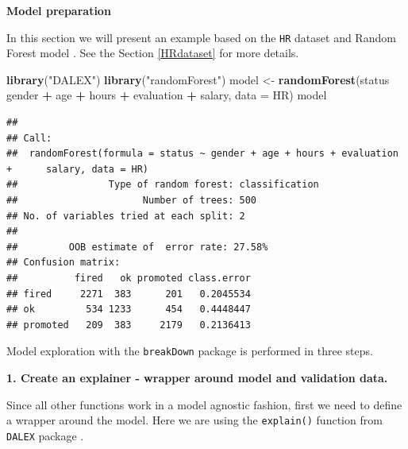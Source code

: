 \documentclass[]{krantz}
\newenvironment{Shaded}{\begin{snugshade}}{\end{snugshade}}
\newcommand{\ControlFlowTok}[1]{\textcolor[rgb]{0.13,0.29,0.53}{\textbf{#1}}}
\newcommand{\DataTypeTok}[1]{\textcolor[rgb]{0.13,0.29,0.53}{#1}}
\newcommand{\DecValTok}[1]{\textcolor[rgb]{0.00,0.00,0.81}{#1}}
\newcommand{\KeywordTok}[1]{\textcolor[rgb]{0.13,0.29,0.53}{\textbf{#1}}}
\newcommand{\NormalTok}[1]{#1}
\newcommand{\OperatorTok}[1]{\textcolor[rgb]{0.81,0.36,0.00}{\textbf{#1}}}
\newcommand{\StringTok}[1]{\textcolor[rgb]{0.31,0.60,0.02}{#1}}
\theoremstyle{definition}
\theoremstyle{definition}
\theoremstyle{definition}
\theoremstyle{remark}
\begin{document}
\textbf{Model preparation}

In this section we will present an example based on the \texttt{HR}
dataset and Random Forest model \citep{R-randomForest}. See the Section
\ref{HRdataset} for more details.

\begin{Shaded}
\begin{Highlighting}[]
\KeywordTok{library}\NormalTok{(}\StringTok{"DALEX"}\NormalTok{)}
\KeywordTok{library}\NormalTok{(}\StringTok{"randomForest"}\NormalTok{)}
\NormalTok{model <-}\StringTok{ }\KeywordTok{randomForest}\NormalTok{(status }\OperatorTok{~}\StringTok{ }\NormalTok{gender }\OperatorTok{+}\StringTok{ }\NormalTok{age }\OperatorTok{+}\StringTok{ }\NormalTok{hours }\OperatorTok{+}\StringTok{ }\NormalTok{evaluation }\OperatorTok{+}\StringTok{ }\NormalTok{salary, }\DataTypeTok{data =}\NormalTok{ HR)}
\NormalTok{model}
\end{Highlighting}
\end{Shaded}

\begin{verbatim}
## 
## Call:
##  randomForest(formula = status ~ gender + age + hours + evaluation +      salary, data = HR) 
##                Type of random forest: classification
##                      Number of trees: 500
## No. of variables tried at each split: 2
## 
##         OOB estimate of  error rate: 27.58%
## Confusion matrix:
##          fired   ok promoted class.error
## fired     2271  383      201   0.2045534
## ok         534 1233      454   0.4448447
## promoted   209  383     2179   0.2136413
\end{verbatim}

Model exploration with the \texttt{breakDown} package is performed in
three steps.

\textbf{1. Create an explainer - wrapper around model and validation
data.}

Since all other functions work in a model agnostic fashion, first we
need to define a wrapper around the model. Here we are using the
\texttt{explain()} function from \texttt{DALEX} package \citep{R-DALEX}.

\begin{Shaded}
\end{Shaded}
\end{document}
